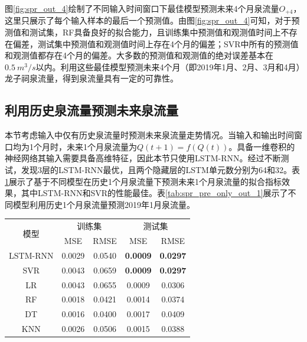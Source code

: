图\ref{fig:spr_out_4}绘制了不同输入时间窗口下最佳模型预测未来4个月泉流量$O_{+4}$，这里只展示了每个输入样本的最后一个预测值。由图\ref{fig:spr_out_4}可知，对于预测值和测试集，RF具备良好的拟合能力，且训练集中预测值和观测值时间上不存在偏差，测试集中预测值和观测值时间上存在4个月的偏差；SVR中所有的预测值和观测值都存在4个月的偏差。大多数的预测值和观测值的绝对误差基本在$\SI{0.5}{m^{3}/s}$以内。利用这些最佳模型预测未来4个月（即2019年1月、2月、3月和4月）龙子祠泉流量，得到泉流量具有一定的可靠性。

\subsection{利用历史泉流量预测未来泉流量}\label{sec:spr_only}

本节考虑输入中仅有历史泉流量时预测未来泉流量走势情况。当输入和输出时间窗口均为1个月时，未来1个月泉流量为$Q(t+1)=f(Q(t))$。具备一维卷积的神经网络其输入需要具备高维特征，因此本节只使用LSTM-RNN。经过不断测试，发现3层的LSTM-RNN最优，且两个隐藏层的LSTM单元数分别为64和32。表\ref{tab:spr_indicators_only_out_1}展示了基于不同模型在历史1个月泉流量下预测未来1个月泉流量的拟合指标效果，其中LSTM-RNN和SVR的性能最佳。表\ref{tab:spr_pre_only_out_1}展示了不同模型利用历史1个月泉流量预测2019年1月泉流量。

\begin{table}[!htbp]
  \centering
  \label{tab:spr_indicators_only_out_1}
  \footnotesize
  \renewcommand{\arraystretch}{1}
  \begin{tabular}{ccccc}
    \toprule
    \multirow{2}{*}{模型} & \multicolumn{2}{c}{训练集} & \multicolumn{2}{c}{测试集}\\
    \cmidrule(lr){2-3} \cmidrule(lr){4-5}
    \noalign{\smallskip}
    & MSE & RMSE & MSE & RMSE \\
    \midrule 
    LSTM-RNN & 0.0029 & 0.0540 & \textbf{0.0009} & \textbf{0.0297} \\
    SVR & 0.0043 & 0.0659 & \textbf{0.0009} & \textbf{0.0297} \\
    LR & 0.0043 & 0.0655 & 0.0009 & 0.0306 \\
    RF & 0.0018 & 0.0421 & 0.0014 & 0.0374 \\
    DT & 0.0016 & 0.0400 & 0.0017 & 0.0409 \\
    KNN & 0.0026 & 0.0506 & 0.0015 & 0.0388 \\
    \bottomrule
  \end{tabular}
\end{table}

